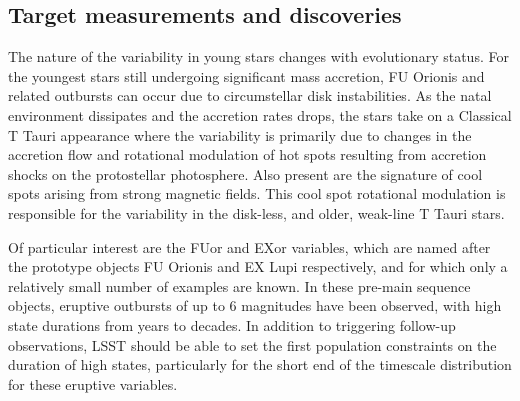 


\subsection{Target measurements and discoveries}
\label{sec:\secname:targets}

The nature of the variability in young stars changes with evolutionary
status. For the youngest stars still undergoing significant mass
accretion, FU Orionis and related outbursts can occur due to
circumstellar disk instabilities. As the natal environment dissipates
and the accretion rates drops, the stars take on a Classical T Tauri
appearance where the variability is primarily due to changes in the
accretion flow and rotational modulation of hot spots resulting from
accretion shocks on the protostellar photosphere. Also present are the
signature of cool spots arising from strong magnetic fields. This cool
spot rotational modulation is responsible for the variability in the
disk-less, and older, weak-line T Tauri stars.

Of particular interest are the FUor and EXor variables, which are
  named after the prototype objects FU Orionis \citep{hartmann96}
  and EX Lupi \citep{herbig01} respectively, and for which
  only a relatively small number of examples are known. In these
  pre-main sequence objects, eruptive outbursts of up to 6 magnitudes
  have been observed, with high state durations from years to
  decades. In addition to triggering follow-up observations, LSST
  should be able to set the first population constraints on the
  duration of high states, particularly for the short end of the
  timescale distribution for these eruptive variables.




